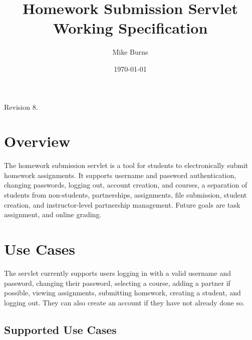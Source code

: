 \documentclass[a4paper]{article}
\begin{document}
\title{Homework Submission Servlet Working Specification}
\author{Mike Burns}
\date{\today}

\maketitle

Revision 8.

\section{Overview}\label{sec:overview}

The homework submission servlet is a tool for students to electronically submit
homework assignments. It supports username and password authentication,
changing passwords, logging out, account creation, and courses, a separation of
students from non-students, partnerships, assignments, file submission, student
creation, and instructor-level partnership management.  Future goals are task
assignment, and online grading.

\section{Use Cases}\label{sec:usecases}

The servlet currently supports users logging in with a valid username and
password, changing their password, selecting a course, adding a partner if
possible, viewing assignments, submitting homework, creating a student, and
logging out. They can also create an account if they have not already done so.

\subsection{Supported Use Cases}\label{subsec:detailed-usecases}
\end{document}
